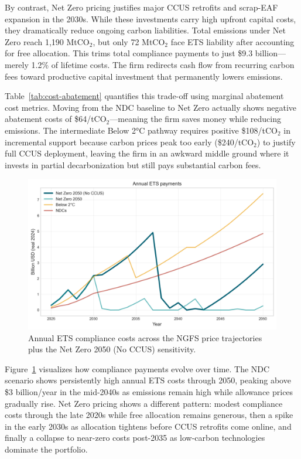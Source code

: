 \documentclass[preprint,1p,authoryear]{elsarticle}
\begin{document}
By contrast, Net Zero pricing justifies major CCUS retrofits and scrap-EAF expansion in the 2030s. While these investments carry high upfront capital costs, they dramatically reduce ongoing carbon liabilities. Total emissions under Net Zero reach 1,190 MtCO$_2$, but only 72 MtCO$_2$ face ETS liability after accounting for free allocation. This trims total compliance payments to just \$9.3 billion—merely 1.2\% of lifetime costs. The firm redirects cash flow from recurring carbon fees toward productive capital investment that permanently lowers emissions.

Table~\ref{tab:cost-abatement} quantifies this trade-off using marginal abatement cost metrics. Moving from the NDC baseline to Net Zero actually shows negative abatement costs of \$64/tCO$_2$—meaning the firm saves money while reducing emissions. The intermediate Below 2°C pathway requires positive \$108/tCO$_2$ in incremental support because carbon prices peak too early (\$240/tCO$_2$) to justify full CCUS deployment, leaving the firm in an awkward middle ground where it invests in partial decarbonization but still pays substantial carbon fees.

\begin{figure}[!t]
  \centering
  \includegraphics[width=0.8\linewidth]{ets_cost_by_scenario}
  \caption{Annual ETS compliance costs across the NGFS price trajectories plus the Net Zero 2050 (No CCUS) sensitivity.}
  \label{fig:ets-costs}
\end{figure}

Figure~\ref{fig:ets-costs} visualizes how compliance payments evolve over time. The NDC scenario shows persistently high annual ETS costs through 2050, peaking above \$3 billion/year in the mid-2040s as emissions remain high while allowance prices gradually rise. Net Zero pricing shows a different pattern: modest compliance costs through the late 2020s while free allocation remains generous, then a spike in the early 2030s as allocation tightens before CCUS retrofits come online, and finally a collapse to near-zero costs post-2035 as low-carbon technologies dominate the portfolio.
\end{document}
